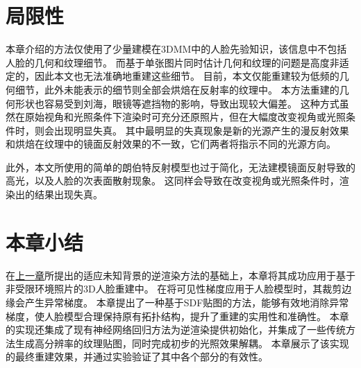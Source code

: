 \section{局限性}

本章介绍的方法仅使用了少量建模在3DMM中的人脸先验知识，该信息中不包括人脸的几何和纹理细节。
而基于单张图片同时估计几何和纹理的问题是高度非适定的，因此本文也无法准确地重建这些细节。
目前，本文仅能重建较为低频的几何细节，此外未能表示的细节则全部会烘焙在反射率的纹理中。
本方法重建的几何形状也容易受到刘海，眼镜等遮挡物的影响，导致出现较大偏差。
这种方式虽然在原始视角和光照条件下渲染时可充分还原照片，但在大幅度改变视角或光照条件时，则会出现明显失真。
其中最明显的失真现象是新的光源产生的漫反射效果和烘焙在纹理中的镜面反射效果的不一致，它们两者将指示不同的光源方向。

此外，本文所使用的简单的朗伯特反射模型也过于简化，无法建模镜面反射导致的高光，以及人脸的次表面散射现象。
这同样会导致在改变视角或光照条件时，渲染出的结果出现失真。

\section*{本章小结}

在\hyperref[chap:method]{上一章}所提出的适应未知背景的逆渲染方法的基础上，本章将其成功应用于基于非受限环境照片的3D人脸重建中。
在将可见性梯度应用于人脸模型时，其裁剪边缘会产生异常梯度。
本章提出了一种基于SDF贴图的方法，能够有效地消除异常梯度，使人脸模型合理保持原有拓扑结构，提升了重建的实用性和准确性。
本章的实现还集成了现有神经网络回归方法为逆渲染提供初始化，并集成了一些传统方法生成高分辨率的纹理贴图，同时完成初步的光照效果解耦。
本章展示了该实现的最终重建效果，并通过实验验证了其中各个部分的有效性。
